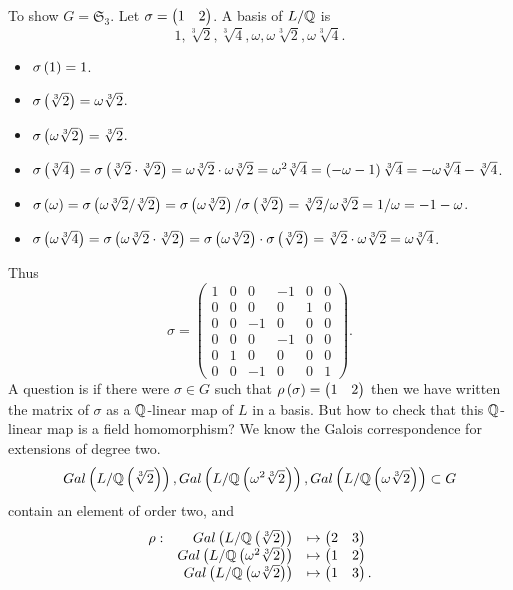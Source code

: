 \begin{example*}
To show $ G = \mathfrak{S}_3 $. Let $ \sigma = \onebytwo{1}{2} $. A basis of $ L / \Q $ is
$$ 1, \sqrt[3]{2}, \sqrt[3]{4}, \omega, \omega\sqrt[3]{2}, \omega\sqrt[3]{4}. $$
\begin{itemize}
\item $ \sigma\rb{1} = 1 $.
\item $ \sigma\rb{\sqrt[3]{2}} = \omega\sqrt[3]{2} $.
\item $ \sigma\rb{\omega\sqrt[3]{2}} = \sqrt[3]{2} $.
\item $ \sigma\rb{\sqrt[3]{4}} = \sigma\rb{\sqrt[3]{2} \cdot \sqrt[3]{2}} = \omega\sqrt[3]{2} \cdot \omega\sqrt[3]{2} = \omega^2\sqrt[3]{4} = \rb{-\omega - 1}\sqrt[3]{4} = -\omega\sqrt[3]{4} - \sqrt[3]{4} $.
\item $ \sigma\rb{\omega} = \sigma\rb{\omega\sqrt[3]{2} / \sqrt[3]{2}} = \sigma\rb{\omega\sqrt[3]{2}} / \sigma\rb{\sqrt[3]{2}} = \sqrt[3]{2} / \omega\sqrt[3]{2} = 1 / \omega = -1 - \omega $.
\item $ \sigma\rb{\omega\sqrt[3]{4}} = \sigma\rb{\omega\sqrt[3]{2} \cdot \sqrt[3]{2}} = \sigma\rb{\omega\sqrt[3]{2}} \cdot \sigma\rb{\sqrt[3]{2}} = \sqrt[3]{2} \cdot \omega\sqrt[3]{2} = \omega\sqrt[3]{4} $.
\end{itemize}
Thus
$$ \sigma =
\begin{pmatrix}
1 & 0 & 0 & -1 & 0 & 0 \\
0 & 0 & 0 & 0 & 1 & 0 \\
0 & 0 & -1 & 0 & 0 & 0 \\
0 & 0 & 0 & -1 & 0 & 0 \\
0 & 1 & 0 & 0 & 0 & 0 \\
0 & 0 & -1 & 0 & 0 & 1
\end{pmatrix}.
$$
A question is if there were $ \sigma \in G $ such that $ \rho\rb{\sigma} = \onebytwo{1}{2} $ then we have written the matrix of $ \sigma $ as a $ \Q $-linear map of $ L $ in a basis. But how to check that this $ \Q $-linear map is a field homomorphism? We know the Galois correspondence for extensions of degree two.
$$ Gal\rb{L / \Q\rb{\sqrt[3]{2}}}, Gal\rb{L / \Q\rb{\omega^2\sqrt[3]{2}}}, Gal\rb{L / \Q\rb{\omega\sqrt[3]{2}}} \subset G $$
contain an element of order two, and
$$
\begin{array}{rrl}
\rho : & Gal\rb{L / \Q\rb{\sqrt[3]{2}}} & \mapsto \onebytwo{2}{3} \\
& Gal\rb{L / \Q\rb{\omega^2\sqrt[3]{2}}} & \mapsto \onebytwo{1}{2} \\
& Gal\rb{L / \Q\rb{\omega\sqrt[3]{2}}} & \mapsto \onebytwo{1}{3}.

\end{array}$$
\end{example*}

